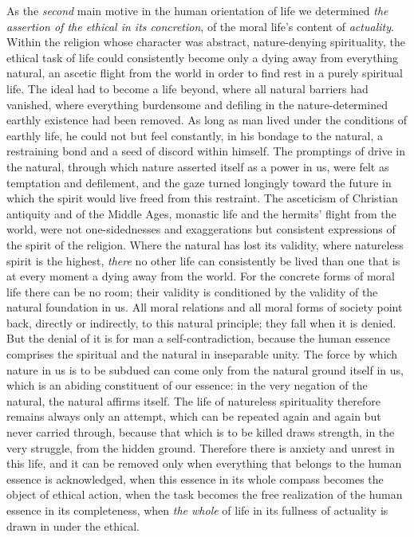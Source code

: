 \documentclass[12pt,a4paper,openany]{book}
\newcommand{\opage}[1]{\marginnote{\footnotesize\textit{[#1]}}}
\begin{document}
As the \emph{second} main motive in the human orientation of life
we determined \emph{the assertion of the ethical in its concretion},
of the moral life's content of \emph{actuality}. Within the religion
whose character was abstract, nature-denying spirituality, the
ethical task of life could consistently become only a dying away
from everything natural, an ascetic flight from the world in order
to find rest in a purely spiritual life. The ideal had to become a
life beyond, where all natural barriers had vanished, where
everything burdensome and defiling in the
\opage{496}nature-determined earthly existence had been removed. As long as
man lived under the conditions of earthly life, he could not but
feel constantly, in his bondage to the natural, a restraining bond
and a seed of discord within himself. The promptings of drive in the
natural, through which nature asserted itself as a power in us, were
felt as temptation and defilement, and the gaze turned longingly
toward the future in which the spirit would live freed from this
restraint. The asceticism of Christian antiquity and of the Middle
Ages, monastic life and the hermits' flight from the world, were not
one-sidednesses and exaggerations but consistent expressions of the
spirit of the religion. Where the natural has lost its validity,
where natureless spirit is the highest, \emph{there} no other life can
consistently be lived than one that is at every moment a dying away
from the world. For the concrete forms of moral life there can be no
room; their validity is conditioned by the validity of the natural
foundation in us. All moral relations and all moral forms of society
point back, directly or indirectly, to this natural principle; they
fall when it is denied. But the denial of it is for man a
self-contradiction, because the human essence comprises the
spiritual and the natural in inseparable unity. The force by which
nature in us is to be subdued can come only from the natural ground
itself in us, which is an abiding constituent of our essence: in the
very negation of the natural, the natural affirms itself. The life of
natureless spirituality therefore remains always only an attempt,
which can be repeated again and again but never carried through,
because that which is to be killed draws strength, in the very
struggle, from the hidden ground. Therefore there is anxiety and
unrest in this life, and it can be removed only when everything that
belongs to the human essence is acknowledged, when this essence in
its whole compass becomes the object of ethical action, when the task
becomes the free realization of the human essence in its
completeness, when \emph{the whole} of life in its fullness of actuality
is drawn in under the ethical.
\end{document}
